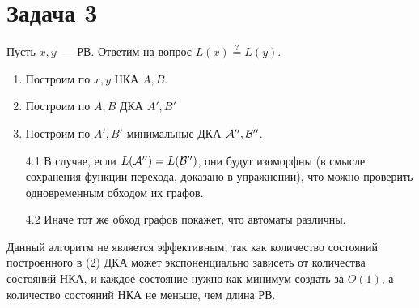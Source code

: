 \documentclass[a4paper]{article}
\def\A{{\cal A}}
\def\B{{\cal B}}
\begin{document}
\section*{Задача 3}
Пусть $x,y$~--- РВ. Ответим на вопрос $L(x)\overset{?}{=}L(y)$.
\begin{enumerate}
\item Построим по $x,y$ НКА $A,B$.
\item Построим по $A,B$ ДКА $A',B'$
\item Построим по $A',B'$ минимальные ДКА $\A'',\B''$. 
\item [4.1] В случае, если $L(\A'')=L(\B'')$, они будут изоморфны (в смысле сохранения функции перехода, доказано в упражнении), что можно проверить одновременным обходом их графов.
\item [4.2] Иначе тот же обход графов покажет, что автоматы различны.
\end{enumerate}
Данный алгоритм не является эффективным, так как количество состояний построенного в (2) ДКА может экспоненциально зависеть от количества состояний НКА, и каждое состояние нужно как минимум создать за $O(1)$, а количество состояний НКА не меньше, чем длина РВ.
\end{document}
